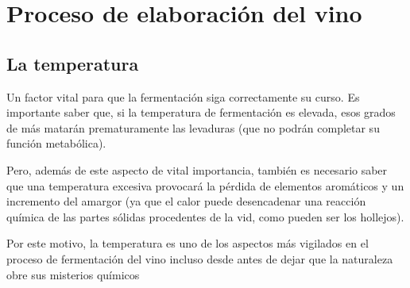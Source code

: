 \section{Proceso de elaboración del vino}

\subsection{La temperatura}

  Un factor vital para que la fermentación siga correctamente su curso. Es importante saber que, si la temperatura de fermentación es elevada, esos grados de más matarán prematuramente las levaduras (que no podrán completar su función metabólica).

  Pero, además de este aspecto de vital importancia, también es necesario saber que una temperatura excesiva provocará la pérdida de elementos aromáticos y un incremento del amargor (ya que el calor puede desencadenar una reacción química de las partes sólidas procedentes de la vid, como pueden ser los hollejos).

  Por este motivo, la temperatura es uno de los aspectos más vigilados en el proceso de fermentación del vino incluso desde antes de dejar que la naturaleza obre sus misterios químicos





